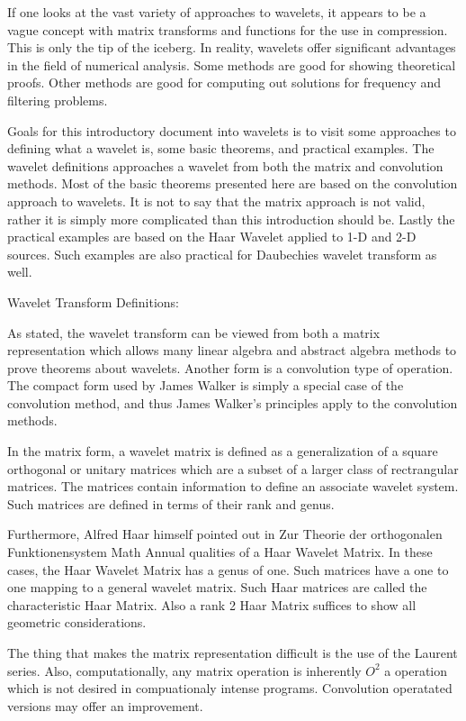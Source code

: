 \documentclass{article}
\begin{document}
If one looks at the vast variety of approaches to wavelets, it appears to be
a vague concept with matrix transforms and functions for the use in
compression. This is only the tip of the iceberg. In reality, wavelets offer
significant advantages in the field of numerical analysis. Some methods are
good for showing theoretical proofs. Other methods are good for computing
out solutions for frequency and filtering problems.

Goals for this introductory document into wavelets is to visit some
approaches to defining what a wavelet is, some basic theorems, and practical
examples. The wavelet definitions approaches a wavelet from both the matrix
and convolution methods. Most of the basic theorems presented here are based
on the convolution approach to wavelets. It is not to say that the matrix
approach is not valid, rather it is simply more complicated than this
introduction should be. Lastly the practical examples are based on the Haar
Wavelet applied to 1-D and 2-D sources. Such examples are also practical for
Daubechies wavelet transform as well.

Wavelet Transform Definitions:

As stated, the wavelet transform can be viewed from both a matrix
representation which allows many linear algebra and abstract algebra methods
to prove theorems about wavelets. Another form is a convolution type of
operation. The compact form used by James Walker is simply a special case of
the convolution method, and thus James Walker's principles apply to the
convolution methods.

In the matrix form, a wavelet matrix is defined as a generalization of a
square orthogonal or unitary matrices which are a subset of a larger class
of rectrangular matrices. The matrices contain information to define an
associate wavelet system. Such matrices are defined in terms of their rank
and genus.

Furthermore, Alfred Haar himself pointed out in Zur Theorie der orthogonalen
Funktionensystem Math Annual qualities of a Haar Wavelet Matrix. In these
cases, the Haar Wavelet Matrix has a genus of one. Such matrices have a one
to one mapping to a general wavelet matrix. Such Haar matrices are called
the characteristic Haar Matrix. Also a rank 2 Haar Matrix suffices to show
all geometric considerations.

The thing that makes the matrix representation difficult is the use of the
Laurent series. Also, computationally, any matrix operation is inherently $%
O^{2}$ a operation which is not desired in compuationaly intense programs.
Convolution operatated versions may offer an improvement.
\end{document}
